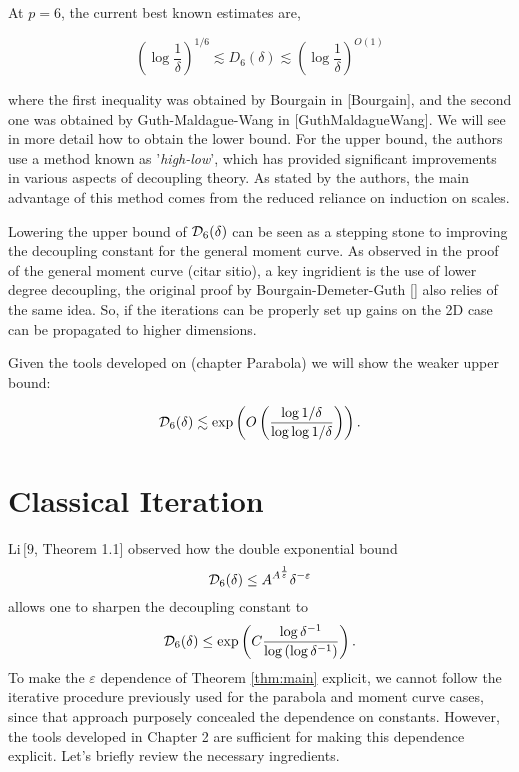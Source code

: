 At $p=6$, the current best known estimates are,


\begin{equation*}
\left(\log \frac{1}{\delta}\right)^{1 / 6} \lesssim D_{6}(\delta) \lesssim \left(\log \frac{1}{\delta}\right)^{O(1)}
\end{equation*}

where the first inequality was obtained by Bourgain in [Bourgain], and the second one was obtained by Guth-Maldague-Wang in [GuthMaldagueWang]. We will see in more detail how to obtain the lower bound. For the upper bound, the authors use a method known as '\emph{high-low}', which has provided significant improvements in various aspects of decoupling theory. As stated by the authors, the main advantage of this method comes from the reduced reliance on induction on scales.

Lowering the upper bound of \(\mathcal{D}_6(\delta)\) can be seen as a stepping stone to improving the decoupling constant for the general moment curve.
As observed in the proof of the general moment curve (citar sitio), a key ingridient is the use of lower degree decoupling, the original proof by Bourgain-Demeter-Guth [] also relies of the same idea. So, if the iterations can be properly set up gains on the 2D case can be propagated to higher dimensions.

Given the tools developed on (chapter Parabola) we will show the weaker upper bound:

\begin{thm}\label{thm: improv.parabola}
$$
\mathcal{D}_6(\delta)\lesssim \exp \left(O\left(\frac{\log 1/\delta}{\log \log 1/\delta}\right)\right).
$$
\end{thm}
\section{Classical Iteration}
 $\mathrm{Li}\, [9$, Theorem 1.1] observed how the double exponential bound
\begin{equation}
\mathcal{D}_6(\delta) \leq A^{A^{\frac{1}{\varepsilon}}} \delta^{-\varepsilon}
\end{equation}
allows one to sharpen the decoupling constant to
$$
\mathcal{D}_6(\delta) \leq \exp \left(C \frac{\log \delta^{-1}}{\log \left(\log \delta^{-1}\right)}\right).
$$
To make the $\varepsilon$ dependence of Theorem \ref{thm:main} explicit, we cannot follow the iterative procedure previously used for the parabola and moment curve cases, since that approach purposely concealed the dependence on constants. However, the tools developed in Chapter 2 are sufficient for making this dependence explicit. Let’s briefly review the necessary ingredients.

